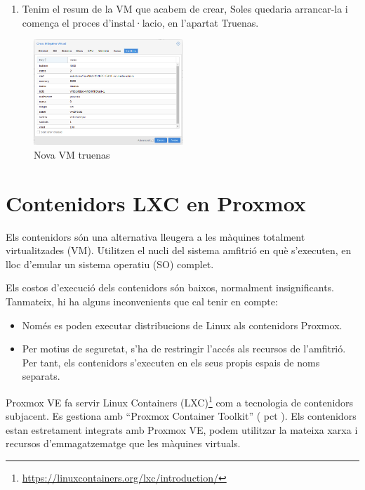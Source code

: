 \documentclass[
  10pt,
]{krantz}
\DeclareRobustCommand{\href}[2]{#2\footnote{\url{#1}}}
\providecommand{\tightlist}{%
  \setlength{\itemsep}{0pt}\setlength{\parskip}{0pt}}
\begin{document}
\begin{enumerate}
\def\labelenumi{\arabic{enumi}.}
\setcounter{enumi}{17}
\tightlist
\item
  Tenim el resum de la VM que acabem de crear, Soles quedaria arrancar-la i comença el proces d'instal·lacio, en l'apartat Truenas.
\end{enumerate}

\begin{figure}
\centering
\includegraphics[width=0.5\textwidth,height=\textheight]{imatges/proxmox/install_truenas8.png}
\caption{Nova VM truenas}
\end{figure}

\hypertarget{contenidors-lxc-en-proxmox}{%
\section{Contenidors LXC en Proxmox}\label{contenidors-lxc-en-proxmox}}

Els contenidors són una alternativa lleugera a les màquines totalment virtualitzades (VM). Utilitzen el nucli del sistema amfitrió en què s'executen, en lloc d'emular un sistema operatiu (SO) complet.

Els costos d'execució dels contenidors són baixos, normalment insignificants. Tanmateix, hi ha alguns inconvenients que cal tenir en compte:

\begin{itemize}
\tightlist
\item
  Només es poden executar distribucions de Linux als contenidors Proxmox.
\item
  Per motius de seguretat, s'ha de restringir l'accés als recursos de l'amfitrió. Per tant, els contenidors s'executen en els seus propis espais de noms separats.
\end{itemize}

Proxmox VE fa servir \href{https://linuxcontainers.org/lxc/introduction/}{Linux Containers (LXC)} com a tecnologia de contenidors subjacent. Es gestiona amb ``Proxmox Container Toolkit'' ( pct ). Els contenidors estan estretament integrats amb Proxmox VE, podem utilitzar la mateixa xarxa i recursos d'emmagatzematge que les màquines virtuals.
\end{document}
